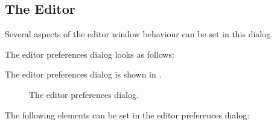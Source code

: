 %
%
\subsection{The Editor}
Several aspects of the editor window behaviour can be set in this dialog.

\begin{htmlonly}
The editor preferences dialog looks as follows:
\end{htmlonly}
\begin{latexonly}
The editor preferences dialog is shown in .
\begin{figure}[ht]
\begin{center}
\caption{The editor preferences dialog.}\label{fig:oeeditor}
\ifpdf
{}
\else
{}
\fi
\end{center}
\end{figure}
\end{latexonly}
The following elements can be set in the editor preferences dialog:
